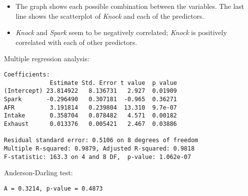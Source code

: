 \begin{frame}
  \vspace{0.75cm}
  \begin{itemize}
    \item The graph shows each possible combination between the variables. The last line shows the scatterplot of \textit{Knock} and each of the predictors.
    \vspace{0.5cm}
    \item \textit{Knock} and \textit{Spark} seem to be negatively correlated; \textit{Knock} is positively correlated with each of other predictors.
  \end{itemize}
\end{frame}

\begin{frame}[fragile]
  Multiple regression analysis:\\
  \begin{small}
    \begin{verbatim}
Coefficients:
             Estimate Std. Error t value  p value    
(Intercept) 23.814922   8.136731   2.927  0.01909  
Spark       -0.296490   0.307181  -0.965  0.36271    
AFR          3.191814   0.239804  13.310  9.7e-07
Intake       0.358704   0.078482   4.571  0.00182
Exhaust      0.013376   0.005421   2.467  0.03886

Residual standard error: 0.5106 on 8 degrees of freedom
Multiple R-squared: 0.9879,	Adjusted R-squared: 0.9818 
F-statistic: 163.3 on 4 and 8 DF,  p-value: 1.062e-07
    \end{verbatim}
  \end{small}
  Anderson-Darling test:\\
  \begin{small}
    \begin{verbatim}
A = 0.3214, p-value = 0.4873
    \end{verbatim}
  \end{small}
\end{frame}


